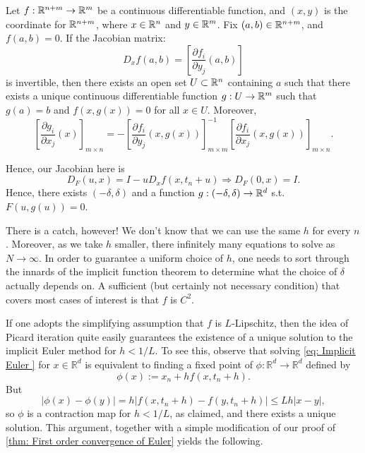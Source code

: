  
 \begin{theorem}
 \label{thm: Implicit function}
 Let $ f: \mathbb{R}^{n+m} \to \mathbb{R}^{m} $ be a continuous differentiable function, and $ (x,y) $ is the coordinate for $ \mathbb{R}^{n+m} $, where $ x\in \mathbb{R}^{n} $ and $ y \in \mathbb{R}^{m} $. Fix $ (a,b) \in\mathbb{R}^{n+m} $, and $ f(a,b)=0 $. If the Jacobian matrix: 
 \[
    D_x f(a,b) = \left[\frac{\partial f_i}{\partial y_j}(a,b)\right]
 \]
 is invertible, then there exists an open set $ U \subset \mathbb{R}^{n} $ containing $ a $ such that there exists a unique continuous differentiable function $ g:U\to \mathbb{R}^{m} $ such that $ g(a)=b $ and $ f(x,g(x))=0 $ for all $ x\in U $. Moreover, 
 \[
    \left[ \frac{\partial g_i}{\partial x_j}(x) \right]_{m\times n} = -\left[  \frac{\partial f_i}{\partial y_j}(x,g(x)) \right]_{m\times m}^{-1}  \left[ \frac{\partial f_i}{\partial x_j}(x, g(x)) \right]_{m\times n}.       
 \]
 \end{theorem}

 Hence, our Jacobian here is 
 \[
    D_ F(u,x) = I - u D_x f(x,t_n+u) \Rightarrow D_F(0,x) = I. 
 \]
 Hence, there exists $ (-\delta , \delta  )  $  and a function $ g:(-\delta , \delta ) \to \mathbb{R}^{d} $ s.t. $ F(u, g(u))=0 $. 
 
 There is a catch, however! We don't know that we can use the same $h$ for every $n$. Moreover, as we take $h$ smaller, there infinitely many equations to solve as $N \rightarrow \infty$. In order to guarantee a uniform choice of $h$, one needs to sort through the innards of the implicit function theorem to determine what the choice of $\delta$ actually depends on. A sufficient (but certainly not necessary condition) that covers most cases of interest is that $f$ is $C^2$.

 If one adopts the simplifying assumption that $f$ is $L$-Lipschitz, then the idea of Picard iteration quite easily guarantees the existence of a unique solution to the implicit Euler method for $h<1 / L$. To see this, observe that solving \eqref{eq: Implicit Euler } for $x \in \mathbb{R}^d$ is equivalent to finding a fixed point of $\phi: \mathbb{R}^d \rightarrow \mathbb{R}^d$ defined by
$$
\phi(x):=x_n+h f\left(x, t_n+h\right) .
$$
But
$$
|\phi(x)-\phi(y)|=h\left|f\left(x, t_n+h\right)-f\left(y, t_n+h\right)\right| \leq L h|x-y|,
$$
so $\phi$ is a contraction map for $h<1 / L$, as claimed, and there exists a unique solution. This argument, together with a simple modification of our proof of \autoref{thm: First order convergence of Euler} yields the following.


